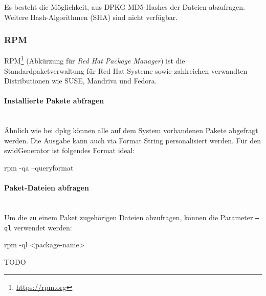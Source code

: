\noindent Es besteht die Möglichkeit, aus DPKG MD5-Hashes der Dateien abzufragen. Weitere
Hash-Algorithmen (\zb SHA) sind nicht verfügbar.


\subsubsection{RPM}

RPM\footnote{\url{https://rpm.org}} (Abkürzung für
\textit{Red Hat Package Manager}) ist die Standardpaketverwaltung für Red Hat Systeme sowie zahlreichen verwandten Distributionen wie SUSE, Mandriva und Fedora.

\paragraph{Installierte Pakete abfragen} \hspace{0pt} \\

Ähnlich wie bei dpkg können alle auf dem System vorhandenen Pakete abgefragt werden. Die Ausgabe kann auch via Format String personalisiert werden. Für den swidGenerator ist folgendes Format ideal:

\begin{bashcode}
rpm -qa --queryformat %
\end{bashcode}

\paragraph{Paket-Dateien abfragen} \hspace{0pt} \\

Um die zu einem Paket zugehörigen Dateien abzufragen, können die Parameter \texttt{--ql} verwendet werden:

\begin{bashcode}
rpm -ql <package-name>
\end{bashcode}

\noindent TODO
